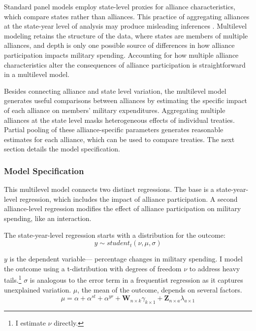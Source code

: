 \documentclass[12pt]{article}
\begin{document}
Standard panel models employ state-level proxies for alliance characteristics, which compare states rather than alliances.
This practice of aggregating alliances at the state-year level of analysis may produce misleading inferences \citep[pg. 356]{McElreath2016}.
Multilevel modeling retains the structure of the data, where states are members of multiple alliances, and depth is only one possible source of differences in how alliance participation impacts military spending. 
Accounting for how multiple alliance characteristics alter the consequences of alliance participation is straightforward in a multilevel model. 


Besides connecting alliance and state level variation, the multilevel model generates useful comparisons between alliances by estimating the specific impact of each alliance on members' military expenditures. 
Aggregating multiple alliances at the state level masks heterogeneous effects of individual treaties. 
Partial pooling of these alliance-specific parameters generates reasonable estimates for each alliance, which can be used to compare treaties. 
The next section details the model specification. 
 


\subsubsection*{Model Specification} 

This multilevel model connects two distinct regressions. 
The base is a state-year-level regression, which includes the impact of alliance participation.
A second alliance-level regression modifies the effect of alliance participation on military spending, like an interaction. 


The state-year-level regression starts with a distribution for the outcome:
\begin{equation}
y \sim student_t(\nu, \mu, \sigma)
\end{equation}
 

$y$ is the dependent variable--- percentage changes in military spending. 
I model the outcome using a t-distribution with degrees of freedom $\nu$ to address heavy tails.\footnote{I estimate $\nu$ directly.}
$\sigma$ is analogous to the error term in a frequentist regression as it captures unexplained variation.  
$\mu$, the mean of the outcome, depends on several factors.
\begin{equation}
\mu = \alpha + \alpha^{st} + \alpha^{yr} +\textbf{W}_{n \times k} \gamma_{k \times 1}  + \textbf{Z}_{n \times a} \lambda_{a \times 1} 
\end{equation}
\end{document}
